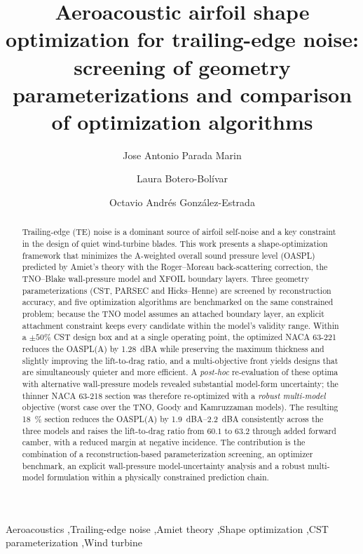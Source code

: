 \documentclass[preprint,3p,times]{elsarticle}
\begin{document}
\begin{frontmatter}

\title{Aeroacoustic airfoil shape optimization for trailing-edge noise:
screening of geometry parameterizations and comparison of optimization
algorithms}

\author{Jose Antonio Parada Marin}
\author{Laura Botero-Bol\'ivar}
\author{Octavio Andr\'es Gonz\'alez-Estrada}
\address{DIMA Research Group, Universidad Industrial de Santander,
Bucaramanga, Colombia}

\begin{abstract}
Trailing-edge (TE) noise is a dominant source of airfoil self-noise and a key
constraint in the design of quiet wind-turbine blades. This work presents a
shape-optimization framework that minimizes the A-weighted overall sound
pressure level (OASPL) predicted by Amiet's theory with the Roger--Moreau
back-scattering correction, the TNO--Blake wall-pressure model and XFOIL
boundary layers. Three geometry parameterizations (CST, PARSEC and
Hicks--Henne) are screened by reconstruction accuracy, and five optimization
algorithms are benchmarked on the same constrained problem; because the TNO
model assumes an attached boundary layer, an explicit attachment constraint
keeps every candidate within the model's validity range. Within a $\pm50\%$
CST design box and at a single operating point, the optimized NACA 63-221
reduces the OASPL(A) by \SI{1.28}{dBA} while preserving the maximum thickness
and slightly improving the lift-to-drag ratio, and a multi-objective front
yields designs that are simultaneously quieter and more efficient. A
\emph{post-hoc} re-evaluation of these optima with alternative wall-pressure
models revealed substantial model-form uncertainty; the thinner NACA 63-218
section was therefore re-optimized with a \emph{robust multi-model} objective
(worst case over the TNO, Goody and Kamruzzaman models). The resulting
\SI{18}{\percent} section reduces the OASPL(A) by \SIrange{1.9}{2.2}{dBA}
consistently across the three models and raises the lift-to-drag ratio from
$60.1$ to $63.2$ through added forward camber, with a reduced margin at
negative incidence. The contribution is the combination of a
reconstruction-based parameterization screening, an optimizer benchmark, an
explicit wall-pressure model-uncertainty analysis and a robust multi-model
formulation within a physically constrained prediction chain.
\end{abstract}

\begin{keyword}
Aeroacoustics \sep Trailing-edge noise \sep Amiet theory \sep Shape
optimization \sep CST parameterization \sep Wind turbine
\end{keyword}

\end{frontmatter}
\end{document}
